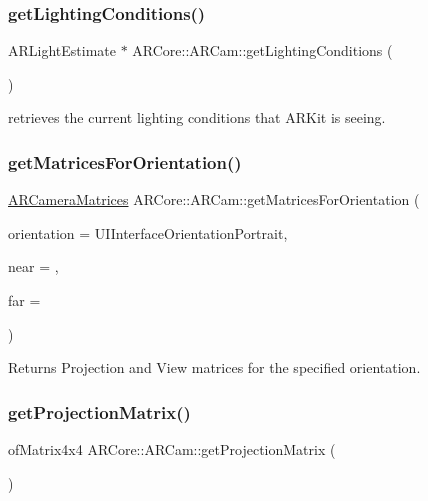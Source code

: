 \subsubsection{\texorpdfstring{get\+Lighting\+Conditions()}{getLightingConditions()}}
{\footnotesize\ttfamily A\+R\+Light\+Estimate $\ast$ A\+R\+Core\+::\+A\+R\+Cam\+::get\+Lighting\+Conditions (\begin{DoxyParamCaption}{ }\end{DoxyParamCaption})}



retrieves the current lighting conditions that A\+R\+Kit is seeing. 

\mbox{\label{class_a_r_core_1_1_a_r_cam_a0061e3c56e3d30e6fec64235d9397809}} 
\subsubsection{\texorpdfstring{get\+Matrices\+For\+Orientation()}{getMatricesForOrientation()}}
{\footnotesize\ttfamily \mbox{\hyperlink{struct_a_r_common_1_1_a_r_camera_matrices}{A\+R\+Camera\+Matrices}} A\+R\+Core\+::\+A\+R\+Cam\+::get\+Matrices\+For\+Orientation (\begin{DoxyParamCaption}\item[{U\+I\+Interface\+Orientation}]{orientation = {\ttfamily UIInterfaceOrientationPortrait},  }\item[{float}]{near = {},  }\item[{float}]{far = {} }\end{DoxyParamCaption})}



Returns Projection and View matrices for the specified orientation. 

\mbox{\label{class_a_r_core_1_1_a_r_cam_a19409c89b0bcbaad62e5d405d194f8a7}} 
\subsubsection{\texorpdfstring{get\+Projection\+Matrix()}{getProjectionMatrix()}}
{\footnotesize\ttfamily of\+Matrix4x4 A\+R\+Core\+::\+A\+R\+Cam\+::get\+Projection\+Matrix (\begin{DoxyParamCaption}{ }\end{DoxyParamCaption})\hspace{0.3cm}{\ttfamily [inline]}}



